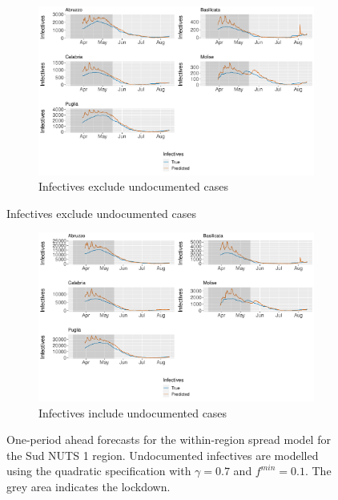 \documentclass[12pt]{article}
\begin{document}
\begin{appendices}
		\begin{figure}[H]
    	    \centering
    	    \begin{subfigure}{\textwidth}
    	      \centering
    	      \includegraphics[width=0.94\linewidth]{output/model_within_lag14_forecast_start20_Sud_rolling.pdf}
    	      \caption{Infectives exclude undocumented cases}
    	      \label{fig:forecast_within_sud_regular}
    	    \end{subfigure}
        \end{figure}
        \begin{figure}[H]\ContinuedFloat
    	    \begin{subfigure}{\textwidth}
    	      \centering
    	      \includegraphics[width=0.94\linewidth]{output/model_within_lag14_forecast_start20_Sud_UndocQuadratic_rolling.pdf}
    	      \caption{Infectives include undocumented cases}
    	      \label{fig:forecast_within_sud_undoc}
    	    \end{subfigure}
    	    \caption{One-period ahead forecasts for the within-region spread model for the Sud NUTS 1 region. Undocumented infectives are modelled using the quadratic specification with $\gamma = 0.7$ and $f^{min}=0.1$. The grey area indicates the lockdown.}
    	    \label{fig:forecast_within_sud}
        \end{figure}
		

\end{appendices}
\end{document}
